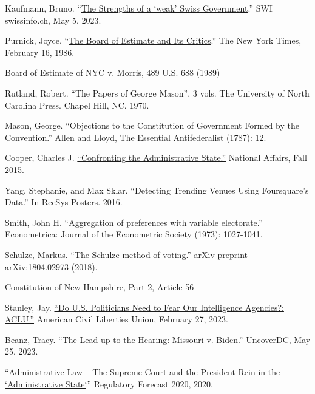 \documentclass{article}
\newcommand{\quotes}[1]{``#1''}
\begin{document}
\begin{thebibliography}{20}
Kaufmann, Bruno. \quotes{\href{https://www.swissinfo.ch/eng/business/the-strengths-of-a--weak--swiss-government/48483858. }{The Strengths of a ‘weak’ Swiss Government}.} SWI swissinfo.ch, May 5, 2023. 

Purnick, Joyce. \quotes{\href{https://www.nytimes.com/1986/02/16/weekinreview/the-board-of-estimate-and-its-critics.html}{The Board of Estimate and Its Critics}.} The New York Times, February 16, 1986.

Board of Estimate of NYC v. Morris, 489 U.S. 688 (1989)

Rutland, Robert. \quotes{The Papers of George Mason}, 3 vols. The University of North Carolina Press. Chapel Hill, NC. 1970.

Mason, George. \quotes{Objections to the Constitution of Government Formed by the Convention.} Allen and Lloyd, The Essential Antifederalist (1787): 12.

Cooper, Charles J. \href{https://www.nationalaffairs.com/publications/detail/confronting-the-administrative-state}{\quotes{Confronting the Administrative State.}} National Affairs, Fall 2015.

Yang, Stephanie, and Max Sklar. \quotes{Detecting Trending Venues Using Foursquare's Data.} In RecSys Posters. 2016.

Smith, John H. \quotes{Aggregation of preferences with variable electorate.} Econometrica: Journal of the Econometric Society (1973): 1027-1041.

Schulze, Markus. \quotes{The Schulze method of voting.} arXiv preprint arXiv:1804.02973 (2018).

Constitution of New Hampshire, Part 2, Article 56

Stanley, Jay. \href{https://www.aclu.org/news/national-security/do-us-politicians-need-fear-our-intelligence}{\quotes{Do U.S. Politicians Need to Fear Our Intelligence Agencies?: ACLU.}} American Civil Liberties Union, February 27, 2023.

Beanz, Tracy. \href{https://www.uncoverdc.com/2023/05/24/the-lead-up-to-the-hearing-missouri-v-biden/}{\quotes{The Lead up to the Hearing: Missouri v. Biden.}} UncoverDC, May 25, 2023. 

\quotes{\href{https://www.crowell.com/a/web/bomv5ATK9LZPNrBA51skWq/4TtiyY/Regulatory-Forecast-2020-Administrative-Law-Crowell-Moring.pdf }{Administrative Law – The Supreme Court and the President Rein in the `Administrative State`}.} Regulatory Forecast 2020, 2020. 


\end{thebibliography}
\end{document}
